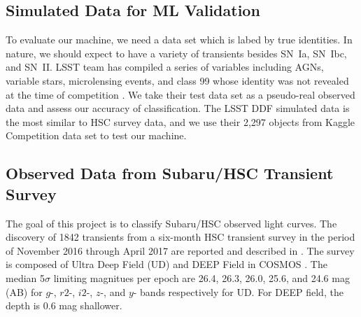 \documentclass[useamsfonts]{pasj01}
\begin{document}
\subsection{Simulated Data for ML Validation}
\label{sec:validation}
To evaluate our machine, we need a data set which is labed by true identities.   In nature, we should 
expect to have a variety of transients besides SN~Ia, SN~Ibc, and SN~II.
LSST team has compiled a series of variables including AGNs, variable stars, microlensing events,
and class 99 whose identity was not revealed at the time of competition \citep{malz19a,kessler19a}.   
We take their test data set as a pseudo-real observed data and assess our accuracy of classification.
The LSST DDF simulated data is the most similar to HSC survey data, and we use their 2,297 objects 
from Kaggle Competition \citep{malz19a} data set to test our machine.

\subsection{Observed Data from Subaru/HSC Transient Survey}
\label{sec:hscdata}
The goal of this project is to classify Subaru/HSC observed light curves. 
The discovery of 1842 transients from a six-month HSC transient survey in the period of
November 2016 through April 2017 are reported and described in \citet{yasuda19a}.
The survey is composed of Ultra Deep Field (UD) and DEEP Field in COSMOS \citep{scoville07a}.
The median 5$\sigma$ limiting magnitues per epoch are 26.4, 26.3, 26.0, 25.6, and 24.6 mag (AB)
for $g$-, $r2$-, $i2$-, $z$-, and $y$- bands respectively for UD. 
For DEEP field, the depth is 0.6 mag shallower.

%
%
%
\end{document}
